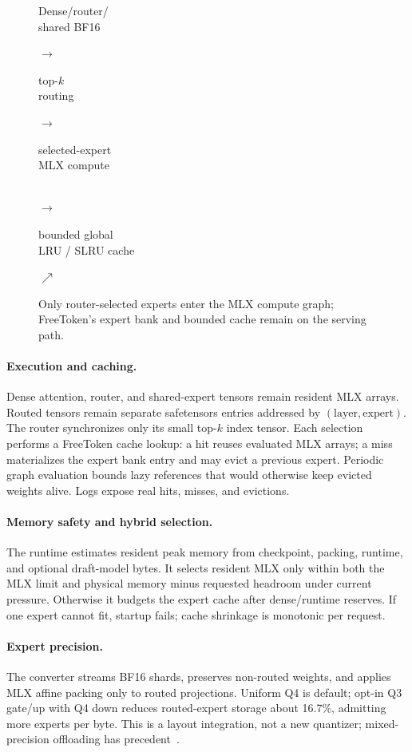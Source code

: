 \documentclass{article}
\begin{document}
\begin{figure}[H]
  \centering
  \setlength{\fboxsep}{4pt}
  \small
  \colorbox{ftlight}{\parbox{0.20\linewidth}{\centering Dense/router/\\shared BF16}}
  $\rightarrow$
  \colorbox{ftlight}{\parbox{0.13\linewidth}{\centering top-$k$\\routing}}
  $\rightarrow$
  \colorbox{ftlight}{\parbox{0.20\linewidth}{\centering selected-expert\\MLX compute}}\\[5pt]
  $\rightarrow$
  \colorbox{ftlight}{\parbox{0.22\linewidth}{\centering bounded global\\LRU / SLRU cache}}
  $\nearrow$
  \caption{Only router-selected experts enter the MLX compute graph;
  FreeToken's expert bank and bounded cache remain on the serving path.}
  \label{fig:design}
\end{figure}

\paragraph{Execution and caching.}
Dense attention, router, and shared-expert tensors remain resident MLX arrays.
Routed tensors remain separate safetensors entries addressed by
$(\mathrm{layer},\mathrm{expert})$. The router synchronizes only its small
top-$k$ index tensor. Each selection performs a FreeToken cache lookup: a hit
reuses evaluated MLX arrays; a miss materializes the expert bank entry and may
evict a previous expert. Periodic graph evaluation bounds lazy references that
would otherwise keep evicted weights alive. Logs expose real hits, misses, and
evictions.

\paragraph{Memory safety and hybrid selection.}
The runtime estimates resident peak memory from checkpoint, packing, runtime,
and optional draft-model bytes. It selects resident MLX only within both the
MLX limit and physical memory minus requested headroom under current pressure.
Otherwise it budgets the expert cache after dense/runtime reserves. If one
expert cannot fit, startup fails; cache shrinkage is monotonic per request.

\paragraph{Expert precision.}
The converter streams BF16 shards, preserves non-routed weights, and applies
MLX affine packing only to routed projections. Uniform Q4 is default; opt-in Q3
gate/up with Q4 down reduces routed-expert storage about 16.7\%, admitting more
experts per byte. This is a layout integration, not a new quantizer;
mixed-precision offloading has precedent~\citep{tang2024hobbit}.
\end{document}
